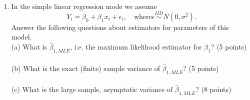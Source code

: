 \documentclass[12pt]{article}
\begin{document}
\begin{enumerate}[leftmargin=\labelsep]
\item In the simple linear regression mode we assume $$Y_i = \beta_0 + \beta_1 x_i + \epsilon_i, \quad \text{where} \epsilon \stackrel{IID}{\sim} N(0, \sigma^2).$$
Answer the following questions about estimators for parameters of this model.\\

(a) What is $\hat{\beta}_{1, MLE}$, i.e. the maximum likelihood estimator for $\beta_1$? (5 points)\\
\vspace{3in}\\
(b) What is the exact (finite) sample variance of $\hat{\beta}_{1, MLE}$? (5 points)\\
\vspace{3in}\\
(c) What is the large sample, asymptotic variance of $\hat{\beta}_{1, MLE}$? (8 points)\\

\end{enumerate}
\end{document}
